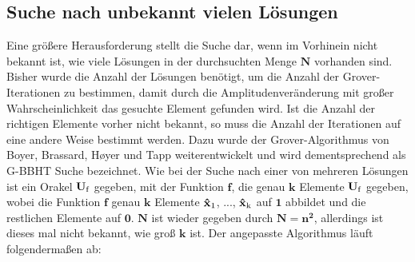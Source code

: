 \subsection{Suche nach unbekannt vielen Lösungen}
Eine größere Herausforderung stellt die Suche dar, wenn im Vorhinein nicht bekannt ist, wie viele Lösungen in der durchsuchten Menge $\mathbf{N}$ vorhanden sind. 
Bisher wurde die Anzahl der Lösungen benötigt, um die Anzahl der Grover-Iterationen zu bestimmen, damit durch die Amplitudenveränderung mit großer Wahrscheinlichkeit das gesuchte Element gefunden wird. 
Ist die Anzahl der richtigen Elemente vorher nicht bekannt, so muss die Anzahl der Iterationen auf eine andere Weise bestimmt werden. 
Dazu wurde der Grover-Algorithmus von Boyer, Brassard, Høyer und Tapp weiterentwickelt und wird dementsprechend als G-BBHT Suche bezeichnet.
Wie bei der Suche nach einer von mehreren Lösungen ist ein Orakel $\mathbf{U \textsubscript{f}}$ gegeben, mit der Funktion $\mathbf{f}$, die genau $\mathbf{k}$ Elemente $\mathbf{U \textsubscript{f}}$ gegeben, wobei die Funktion $\mathbf{f}$ genau $\mathbf{k}$ Elemente $\mathbf{\hat x \textsubscript{1}}$, ..., $\mathbf{\hat x \textsubscript{k}}$ auf $\mathbf{1}$ abbildet und die restlichen Elemente auf $\mathbf{0}$. $\mathbf{N}$ ist wieder gegeben durch $\mathbf{N = n^2}$, allerdings ist dieses mal nicht bekannt, wie groß $\mathbf{k}$ ist. Der angepasste Algorithmus läuft folgendermaßen ab:
